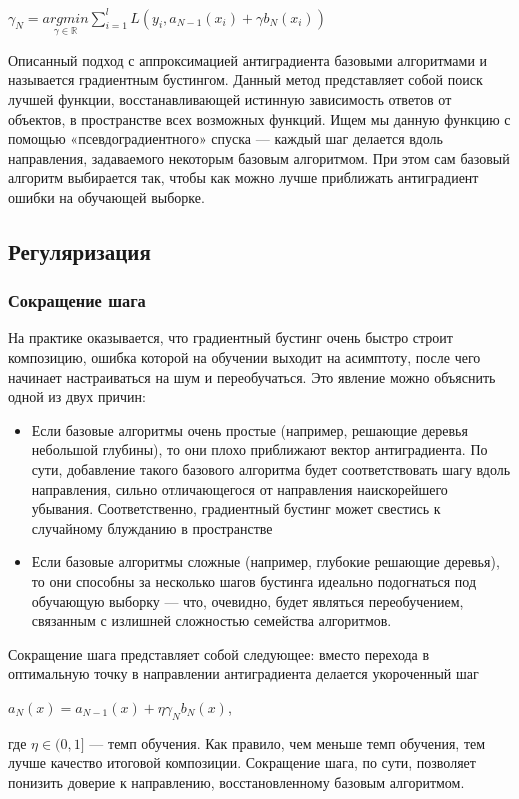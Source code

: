 \documentclass{article}
\begin{document}
$\gamma_N = \underset{\gamma\in\mathbf{\mathbb{R}}}{argmin}\sum_{i=1}^{l} L(y_i,a_{N-1}(x_i) + \gamma b_N(x_i))$

Описанный подход с аппроксимацией антиградиента базовыми алгоритмами и называется градиентным бустингом. Данный метод представляет собой поиск лучшей функции, восстанавливающей истинную зависимость ответов от объектов, в пространстве всех возможных функций. Ищем мы данную функцию с помощью «псевдоградиентного» спуска --- каждый шаг делается вдоль направления, задаваемого некоторым базовым алгоритмом. При этом сам базовый алгоритм выбирается так, чтобы как можно лучше приближать антиградиент ошибки на обучающей выборке.

\subsection{Регуляризация}

\subsubsection{Сокращение шага}

На практике оказывается, что градиентный бустинг очень быстро строит композицию, ошибка которой на обучении выходит на асимптоту, после чего начинает настраиваться на шум и переобучаться. Это явление можно объяснить одной из двух причин:

\begin{itemize}
	\item Если базовые алгоритмы очень простые (например, решающие деревья небольшой глубины), то они плохо приближают вектор антиградиента. По сути, добавление такого базового алгоритма будет соответствовать шагу вдоль направления, сильно отличающегося от направления наискорейшего убывания. Соответственно, градиентный бустинг может свестись к случайному блужданию в
	пространстве
	\item Если базовые алгоритмы сложные (например, глубокие решающие деревья), то они способны за несколько шагов бустинга идеально подогнаться под обучающую выборку — что, очевидно, будет являться переобучением, связанным с излишней сложностью семейства алгоритмов.
\end{itemize}

Сокращение шага представляет собой следующее: вместо перехода в оптимальную точку в направлении антиградиента
делается укороченный шаг

$a_N(x) = a_{N-1}(x) + \eta\gamma_Nb_N(x)$,

где $\eta \in (0,1]$ --- темп обучения. Как правило, чем меньше темп обучения, тем лучше качество итоговой композиции. Сокращение шага, по сути, позволяет понизить доверие к направлению, восстановленному базовым алгоритмом.
\end{document}
